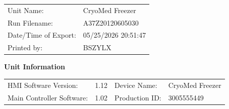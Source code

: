 \documentclass[UTF8,10pt,a4paper,fontset=fandol]{ctexart}
\newcommand{\fieldvalue}[1]{#1}
\newcommand{\handwritten}[1]{#1}
\begin{document}
\begin{tabular}{@{}ll@{}}
Unit Name: &
\fieldvalue{CryoMed Freezer}
\\
Run Filename: &
\fieldvalue{A37Z20120605030}
\\
Date/Time of Export: &
\fieldvalue{05/25/2026 20:51:47}
\\
Printed by: &
\fieldvalue{BSZYLX}
\end{tabular}

\handwritten{}

\handwritten{}

\medskip

\textbf{Unit Information}

\begin{tabular}{@{}ll@{\qquad}ll@{}}
HMI Software Version: &
\fieldvalue{1.12}
&
Device Name: &
\fieldvalue{CryoMed Freezer}
\\
Main Controller Software: &
\fieldvalue{1.02}
&
Production ID: &
\fieldvalue{3005555449}
\end{tabular}

\medskip

\begin{center}
\end{center}
\end{document}
